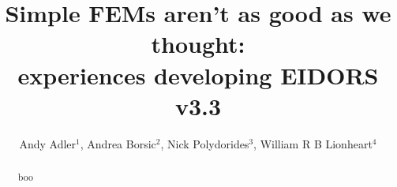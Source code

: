 \documentclass[letterpaper,twocolumn,10pt]{article}
\begin{document}
\title{\bf 
Simple FEMs aren't as good as we thought: \\
  experiences developing EIDORS v3.3%
}

\author{Andy Adler$^{1}$,
        Andrea Borsic$^{2}$,
        Nick Polydorides$^{3}$,
        William R B Lionheart$^{4}$}
\date{}
\maketitle

\begin{abstract}
boo
\end{abstract}
\end{document}
